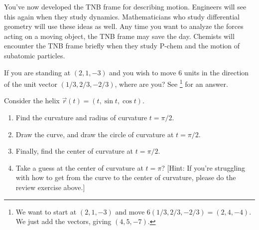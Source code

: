 \indent You've now developed the TNB frame for describing motion. Engineers will see this again when they study dynamics. Mathematicians who study differential geometry will use these ideas as well. Any time you want to analyze the forces acting on a moving object, the TNB frame may save the day. Chemists will encounter the TNB frame briefly when they study P-chem and the motion of subatomic particles.


%
%
%
\begin{review*}
 If you are standing at $(2,1,-3)$ and you wish to move 6 units in the direction of the unit vector $(1/3, 2/3, -2/3)$, where are you? See \footnote{We want to start at $(2,1,-3)$ and move $6(1/3, 2/3, -2/3) = (2,4,-4)$. We just add the vectors, giving $(4,5,-7)$.} for an answer.	
\end{review*}

\begin{problem} %
 Consider the helix $\vec r(t)=(t,\sin t,\cos t)$. 
\begin{enumerate}
	\item Find the curvature and radius of curvature $t=\pi/2$. 
	\item Draw the curve, and draw the circle of curvature at $t=\pi/2$. 
	\item Finally, find the center of curvature at $t=\pi/2$. 
	\item Take a guess at the center of curvature at $t=\pi$? [Hint: If you're struggling with how to get from the curve to the center of curvature, please do the review exercise above.]
\end{enumerate}
\end{problem}


